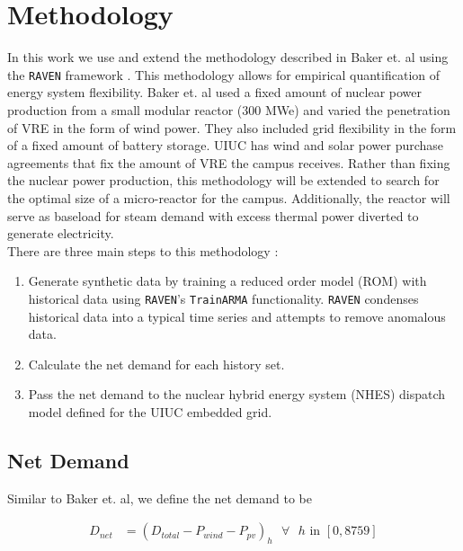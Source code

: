 \section{Methodology}

In this work we use and extend the methodology described in Baker et. al using
the \texttt{RAVEN}
framework \cite{baker_optimal_2018,alfonsi_raven_2016}.
This methodology allows for empirical quantification of energy system
flexibility.
Baker et. al used a fixed amount of nuclear power production from a small
modular reactor (300
MWe) and varied the penetration of VRE in the form of wind power.
They also included grid flexibility in the form of a fixed amount of battery
storage. UIUC has
wind and solar power purchase agreements that fix the amount of VRE the campus
receives.
Rather than fixing the nuclear power production, this methodology will be
extended to search for
the optimal size of a micro-reactor for the campus.
Additionally, the reactor will serve as baseload for steam demand with excess
thermal power
diverted to generate electricity.\\
There are three main steps to this methodology \cite{baker_optimal_2018}:

\begin{enumerate}
	\item Generate synthetic data by training a reduced order model (ROM) with
	historical data using
	\texttt{RAVEN}'s \texttt{TrainARMA} functionality. \texttt{RAVEN} condenses
	historical data into
	a typical time series and attempts to remove anomalous data.
	\item Calculate the net demand for each history set.
	\item Pass the net demand to the nuclear hybrid energy system (NHES) dispatch
	model defined for
	the UIUC embedded grid.
\end{enumerate}

\subsection{Net Demand}
Similar to Baker et. al, we define the net demand to be


\begin{equation}
	\label{eqn:net-demand}
	\begin{split}
		D_{net} & = (D_{total} - P_{wind} - P_{pv})_h \text{ $\forall$ $h$ in }
		[0,8759]
	\end{split}
\end{equation}

